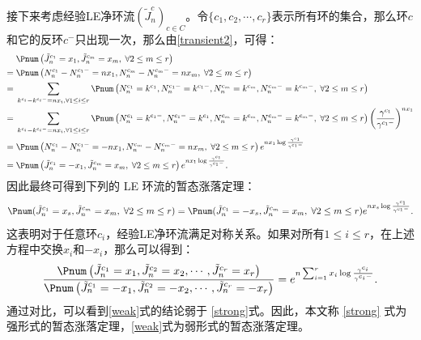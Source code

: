 接下来考虑经验LE净环流$(\tilde{J}^{c}_n)_{c\in C}$。令$\{c_1,c_2,\cdots,c_r\}$表示所有环的集合，那么环$c$和它的反环$c^-$只出现一次，那么由\ref{transient2}，可得：
\begin{align*}
    &\; \Pnum\left(\tilde{J}^{c_1}_n=x_1,\tilde{J}^{c_m}_n=x_m,\;\forall 2\le m \le r\right) \\
    =&\; \Pnum\left(N^{c_1}_n-N^{c_1-}_n=n x_1,N^{c_m}_n-N^{c_m-}_n=n x_m,\;\forall 2\le m \le r\right) \\
    =&\; \sum_{k^{c_i}-k^{c_i-}=n x_i,\forall 1\le i \le r} \Pnum\left(N^{c_1}_n=k^{c_1},N^{c_1-}_n=k^{c_1-},  N^{c_m}_n=k^{c_m},N^{c_m-}_n=k^{c_m-},\;\forall 2\le m \le r\right) \\
    =&\; \sum_{k^{c_i}-k^{c_i-}=n x_i,\forall 1\le i \le r} \Pnum\left(N^{c_1}_n=k^{c_1-},N^{c_1-}_n=k^{c_1}, N^{c_m}_n=k^{c_m},N^{c_m-}_n=k^{c_m-},\;\forall 2\le m \le r\right)\left(\frac{\gamma^{c_1}}{\gamma^{c_1-}}\right)^{n x_1}  \\
    =&\; \Pnum\left(N^{c_1}_n-N^{c_1-}_n=-n x_1, N^{c_m}_n-N^{c_m-}_n=n x_m,\;\forall 2\le m \le r\right) e^{n x_1 \log \frac{\gamma^{c_1}}{\gamma^{c_1-}}} \\
    =&\; \Pnum\left(\tilde{J}^{c_1}_n=-x_1,\tilde{J}^{c_m}_n=x_m,\;\forall 2\le m \le r\right) e^{n x_1 \log \frac{\gamma^{c_1}}{\gamma^{c_1-}}} .
\end{align*}
因此最终可得到下列的 LE 环流的暂态涨落定理：
\begin{equation}\label{strong}
    \Pnum(\tilde{J}^{c_1}_n=x_s,\tilde{J}^{c_m}_n=x_m,\;\forall 2\le m \le r) \\
    = \Pnum(\tilde{J}^{c_1}_n=-x_s,\tilde{J}^{c_m}_n=x_m,\;\forall 2\le m \le r)e^{nx_s\log\frac{\gamma^{c_1}}{\gamma^{c_1-}}}.
\end{equation}
这表明对于任意环$c_i$，经验LE净环流满足对称关系。如果对所有$1\le i \le r$，在上述方程中交换$x_i$和$-x_i$，那么可以得到：
\begin{equation}\label{weak}
    \begin{split}
    \frac{\Pnum\left(\tilde{J}^{c_1}_n=x_1,\tilde{J}^{c_2}_n=x_2,\cdots,\tilde{J}^{c_{r}}_n=x_{r}\right)}
    {\Pnum\left(\tilde{J}^{c_1}_n=-x_1,\tilde{J}^{c_2}_n=-x_2,\cdots,\tilde{J}^{c_{r}}_n=-x_{r}\right)}
    =e^{n\sum_{i=1}^{r}x_i\log\frac{\gamma^{c_i}}{\gamma^{c_i-}}}.
    \end{split}
\end{equation}
通过对比，可以看到\eqref{weak}式的结论弱于 \eqref{strong}式。因此，本文称 \eqref{strong} 式为强形式的暂态涨落定理，\eqref{weak}式为弱形式的暂态涨落定理。

